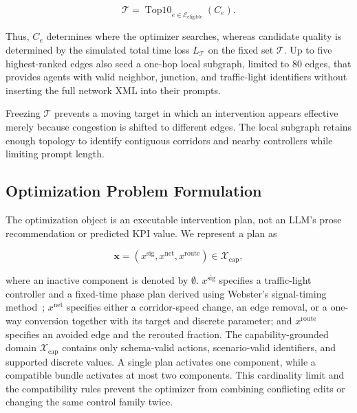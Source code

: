 \documentclass{trbunofficial}
\begin{document}
\begin{equation}
    \mathcal{T}
    =\operatorname{Top10}_{e\in\mathcal{E}_{\mathrm{eligible}}}(C_e).
    \label{eq:baseline-target-set}
\end{equation}

Thus, $C_e$ determines where the optimizer searches, whereas candidate quality
is determined by the simulated total time loss $L_{\mathcal{T}}$ on the fixed
set $\mathcal{T}$.  Up to five highest-ranked edges also seed a one-hop local
subgraph, limited to 80 edges, that provides agents with valid neighbor,
junction, and traffic-light identifiers without inserting the full network XML
into their prompts.

Freezing $\mathcal{T}$ prevents a moving target in which an intervention appears
effective merely because congestion is shifted to different edges.  The local
subgraph retains enough topology to identify contiguous corridors and nearby
controllers while limiting prompt length.

\subsection{Optimization Problem Formulation}
\label{sec:optimization-formulation}

The optimization object is an executable intervention plan, not an LLM's prose
recommendation or predicted KPI value.  We represent a plan as

\begin{equation}
\mathbf{x}=
\left(x^{\mathrm{sig}},x^{\mathrm{net}},x^{\mathrm{route}}\right)
\in\mathcal{X}_{\mathrm{cap}},
\label{eq:decision-vector}
\end{equation}

where an inactive component is denoted by $\emptyset$.
$x^{\mathrm{sig}}$ specifies a traffic-light controller and a fixed-time phase
plan derived using Webster's signal-timing method~\cite{webster1958traffic};
$x^{\mathrm{net}}$ specifies either a corridor-speed
change, an edge removal, or a one-way conversion together with its target and
discrete parameter; and $x^{\mathrm{route}}$ specifies an avoided edge and the
rerouted fraction.  The capability-grounded domain
$\mathcal{X}_{\mathrm{cap}}$ contains only schema-valid actions, scenario-valid
identifiers, and supported discrete values.  A single plan activates one
component, while a compatible bundle activates at most two components.  This
cardinality limit and the compatibility rules prevent the optimizer from
combining conflicting edits or changing the same control family twice.
\end{document}
